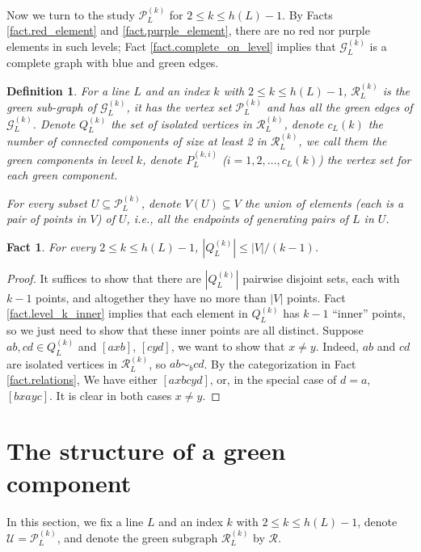 \documentclass[12pt]{article}
\newtheorem{fact}{Fact}
\newtheorem{defi}{Definition}
\begin{document}
Now we turn to the study $\mathcal{P}_L^{(k)}$ for $2 \le k \le h(L)-1$.
By Facts \ref{fact.red_element} and \ref{fact.purple_element},
there are no red nor purple elements in such levels;
Fact \ref{fact.complete_on_level} implies that $\mathcal{G}_L^{(k)}$
is a complete graph with blue and green edges.

\begin{defi}
For a line $L$ and an index $k$ with $2 \le k \le h(L)-1$,
$\mathcal{R}_L^{(k)}$ is the green sub-graph of $\mathcal{G}_L^{(k)}$,
it has the vertex set $\mathcal{P}_L^{(k)}$ and has all the green edges of $\mathcal{G}_L^{(k)}$.
Denote $Q_L^{(k)}$ the set of isolated vertices in $\mathcal{R}_L^{(k)}$,
denote $c_L(k)$ the number of connected components of size at least 2 in $\mathcal{R}_L^{(k)}$,
we call them the {\em green components in level $k$},
denote $P_L^{(k, i)}$ ($i = 1, 2, \dots, c_L(k)$) the vertex set for each green component.

For every subset $U \subseteq \mathcal{P}_L^{(k)}$,
denote $V(U) \subseteq V$ the union of elements (each is a pair of points in $V$) of $U$,
i.e., all the endpoints of generating pairs of $L$ in $U$.
\end{defi}

\begin{fact}\label{fact.Q_size}
For every $2 \le  k \le h(L)-1$, $\left|Q_L^{(k)}\right| \le |V|/(k-1)$.
\end{fact}

\begin{proof}
It suffices to show that there are $|Q_L^{(k)}|$ pairwise disjoint sets, each with
 $k-1$ points, and altogether they have no more than $|V|$ points. Fact \ref{fact.level_k_inner} implies that each element in $Q_L^{(k)}$ has
$k-1$ ``inner'' points, so we just need to show that these inner points are all distinct.
Suppose $ab, cd \in Q_L^{(k)}$ and $[axb]$, $[cyd]$, we want to show that $x \neq y$.
Indeed, $ab$ and $cd$ are isolated vertices in $\mathcal{R}_L^{(k)}$,
so $ab \sim_b cd$.
By the categorization in Fact \ref{fact.relations},
We have either $[axbcyd]$, or, in the special case of $d=a$, $[bxayc]$.
It is clear in both cases $x \neq y$.
\end{proof}

\section{The structure of a green component}\label{sect.green_cpt}

In this section, we fix a line $L$ and an index $k$ with $2 \le  k \le h(L)-1$,
denote $\mathcal{U} = \mathcal{P}_L^{(k)}$,
and denote the green subgraph $\mathcal{R}_L^{(k)}$ by $\mathcal{R}$.
\end{document}
